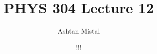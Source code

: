 \documentclass{article}
\title{PHYS 304 Lecture 12}
\author{Ashtan Mistal}
\date{!!!}
\begin{document}
\ifstandalone
\maketitle
\fi

\graphicspath{{./Lecture12/}}
\end{document}
